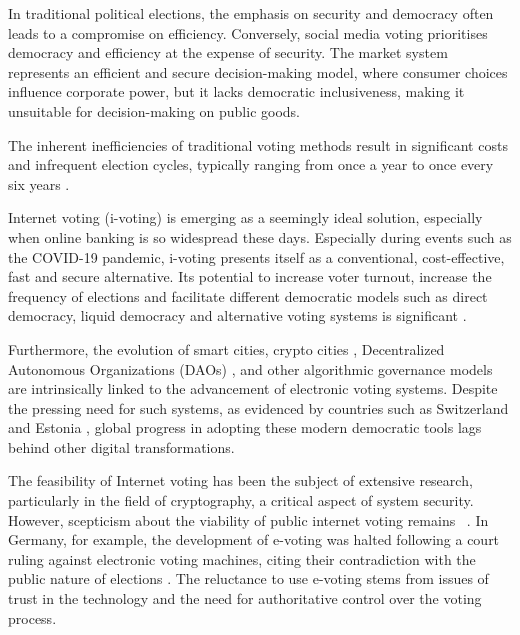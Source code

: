 \documentclass[runningheads]{llncs}
\begin{document}
In traditional political elections, the emphasis on security and democracy often leads to a compromise on efficiency. Conversely, social media voting prioritises democracy and efficiency at the expense of security. The market system represents an efficient and secure decision-making model, where consumer choices influence corporate power, but it lacks democratic inclusiveness, making it unsuitable for decision-making on public goods.

The inherent inefficiencies of traditional voting methods result in significant costs and infrequent election cycles, typically ranging from once a year to once every six years \cite{buterinBlockchainVotingOverrated2021}.

Internet voting (i-voting) is emerging as a seemingly ideal solution, especially when online banking is so widespread these days. Especially during events such as the COVID-19 pandemic, i-voting presents itself as a conventional, cost-effective, fast and secure alternative. Its potential to increase voter turnout, increase the frequency of elections and facilitate different democratic models such as direct democracy, liquid democracy and alternative voting systems is significant \cite{laslierLoserPluralityVoting2011}.

Furthermore, the evolution of smart cities, crypto cities \cite{buterinCryptoCities2021}, Decentralized Autonomous Organizations (DAOs) \cite{wangDecentralizedAutonomousOrganizations2019}, and other algorithmic governance models are intrinsically linked to the advancement of electronic voting systems. Despite the pressing need for such systems, as evidenced by countries such as Switzerland \cite{ElectronicVotingSwitzerland2023} and Estonia \cite{ElectronicVotingEstonia2023}, global progress in adopting these modern democratic tools lags behind other digital transformations.

The feasibility of Internet voting has been the subject of extensive research, particularly in the field of cryptography, a critical aspect of system security. However, scepticism about the viability of public internet voting remains ~\cite{parkGoingBadWorse2021, mearianWhyBlockchainbasedVoting2019, shanklandNoBlockchainIsn2018, leeBlockchainbasedElectionsWould2018, schneierBlockchainVoting2020, schneierBlockchainTrust2019}. In Germany, for example, the development of e-voting was halted following a court ruling against electronic voting machines, citing their contradiction with the public nature of elections \cite{ElectronicVotingCountry2023}. The reluctance to use e-voting stems from issues of trust in the technology and the need for authoritative control over the voting process.
\end{document}
